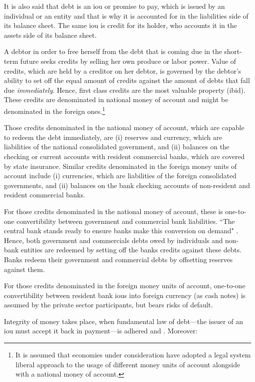 It is also said that debt is an \ac{iou} or promise to pay, which is issued
by an individual or an entity and that is why it is accounted for in the
liabilities side of its balance sheet. The same \ac{iou} is credit for its
holder, who accounts it in the assets side of its balance sheet.

A debtor in order to free herself from the debt that is coming due in
the short-term future seeks credits by selling her own produce or labor
power. Value of credits, which are held by a creditor on her debtor, is
governed by the debtor's ability to set off the equal amount of credits
against the amount of debts that fall due \textit{immediately}. Hence, first
class credits are the most valuable property (ibid). These credits are
denominated in national money of account and might be denominated
in the foreign ones.\footnote{It is assumed that economies under consideration have adopted a legal system liberal approach to the usage of different money units of account alongside with a national money of account.}

Those credits denominated in the national money of account, which
are capable to redeem the debt immediately, are (i) reserves and
currency, which are liabilities of the national consolidated government,
and (ii) balances on the checking or current accounts with resident
commercial banks, which are covered by state insurance. Similar credits
denominated in the foreign money units of account include (i)
currencies, which are liabilities of the foreign consolidated
governments, and (ii) balances on the bank checking accounts of
non-resident and resident commercial banks.

For those credits denominated in the national money of account,
these is one-to-one convertibility between government and commercial
bank liabilities. ``The central bank stands ready to ensure banks make
this conversion on demand" \citep[p.~148]{wray2020}. Hence, both government
and commercials debts owed by individuals and non-bank entities are
redeemed by setting off the banks credits against these debts. Banks
redeem their government and commercial debts by offsetting reserves
against them.

For those credits denominated in the foreign money units of account,
one-to-one convertibility between resident bank \acp{iou} into foreign
currency (as cash notes) is assumed by the private sector participants,
but bears risks of default.

Integrity of money takes place, when fundamental law of debt---the
issuer of an \ac{iou} must accept it back in payment---is adhered
\citep[p.~10]{wray_2020} and \citep[pp.~147-148]{wray2020}. Moreover:

